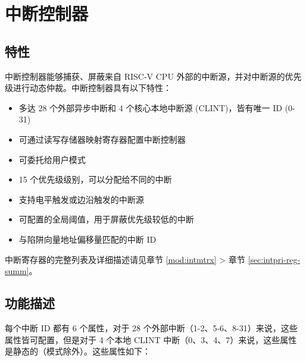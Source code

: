 \documentclass[main\_\_CN.tex]{subfiles}
\begin{document}




\clearpage
\section{中断控制器}
\label{sec:riscvcpu-int-ctrl}

\subsection{特性}
\label{sec:riscvcpu-int-features}
中断控制器能够捕获、屏蔽来自 RISC-V CPU 外部的中断源，并对中断源的优先级进行动态仲裁。中断控制器具有以下特性：

\begin{itemize}
    \item 多达 28 个外部异步中断和 4 个核心本地中断源 (CLINT)，皆有唯一 ID (0-31)
    \item 可通过读写存储器映射寄存器配置中断控制器
    \item 可委托给用户模式
    \item 15 个优先级级别，可以分配给不同的中断
    \item 支持电平触发或边沿触发的中断源
    \item 可配置的全局阈值，用于屏蔽优先级较低的中断
    \item 与陷阱向量地址偏移量匹配的中断 ID
\end{itemize}

中断寄存器的完整列表及详细描述请见章节 \ref{mod:intmtrx} \textit{} > 章节 \ref{sec:intpri-reg-summ}。

\subsection{功能描述}
\label{sec:riscvcpu-int-func-descr}

每个中断 ID 都有 6 个属性，对于 28 个外部中断（1-2、5-6、8-31）来说，这些属性皆可配置，但是对于 4 个本地 CLINT 中断（0、3、4、7）来说，这些属性是静态的（模式除外）。这些属性如下：
\end{document}
